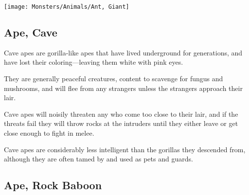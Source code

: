 \begin{multicols*}{2}
\texttt{[image: Monsters/Animals/Ant, Giant]}

\subsection{Ape, Cave}

Cave apes are gorilla-like apes that have lived underground for generations, and have lost their coloring—leaving them white with pink eyes.

They are generally peaceful creatures, content to scavenge for fungus and mushrooms, and will flee from any strangers unless the strangers approach their lair.

Cave apes will noisily threaten any who come too close to their lair, and if the threats fail they will throw rocks at the intruders until they either leave or get close enough to fight in melee.

Cave apes are considerably less intelligent than the gorillas they descended from, although they are often tamed by  and used as pets and guards.

\subsection{Ape, Rock Baboon}
\end{multicols*}
